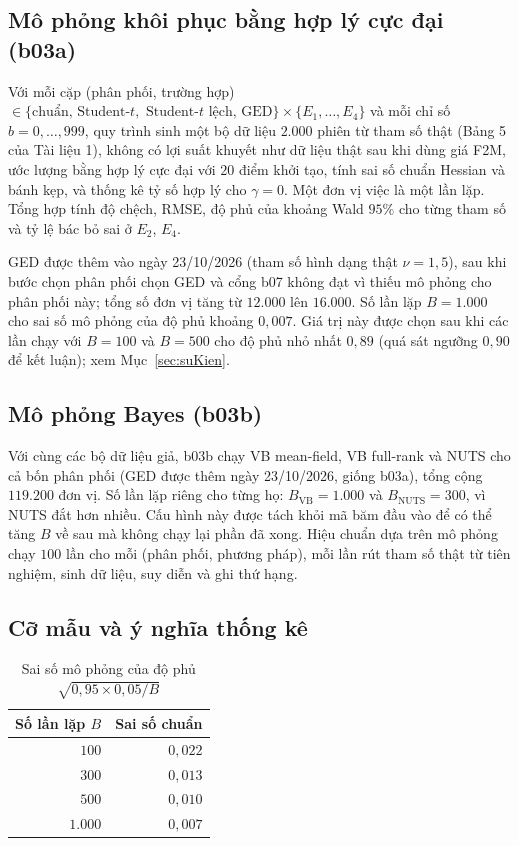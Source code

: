 \documentclass[12pt,a4paper]{article}
\theoremstyle{remark}
\begin{document}
\subsection{Mô phỏng khôi phục bằng hợp lý cực đại (b03a)}

Với mỗi cặp (phân phối, trường hợp) $\in\{\text{chuẩn, Student-}t,\text{ Student-}t\text{ lệch, GED}\}\times\{E_1,\dots,E_4\}$ và mỗi chỉ số $b=0,\dots,999$, quy trình sinh một bộ dữ liệu $2.000$ phiên từ tham số thật (Bảng 5 của Tài liệu 1), không có lợi suất khuyết như dữ liệu thật sau khi dùng giá F2M, ước lượng bằng hợp lý cực đại với $20$ điểm khởi tạo, tính sai số chuẩn Hessian và bánh kẹp, và thống kê tỷ số hợp lý cho $\gamma=0$. Một đơn vị việc là một lần lặp. Tổng hợp tính độ chệch, RMSE, độ phủ của khoảng Wald $95\%$ cho từng tham số và tỷ lệ bác bỏ sai ở $E_2$, $E_4$.

GED được thêm vào ngày 23/10/2026 (tham số hình dạng thật $\nu=1{,}5$), sau khi bước chọn phân phối chọn GED và cổng b07 không đạt vì thiếu mô phỏng cho phân phối này; tổng số đơn vị tăng từ $12.000$ lên $16.000$. Số lần lặp $B=1.000$ cho sai số mô phỏng của độ phủ khoảng $0{,}007$. Giá trị này được chọn sau khi các lần chạy với $B=100$ và $B=500$ cho độ phủ nhỏ nhất $0{,}89$ (quá sát ngưỡng $0{,}90$ để kết luận); xem Mục~\ref{sec:suKien}.

\subsection{Mô phỏng Bayes (b03b)}

Với cùng các bộ dữ liệu giả, b03b chạy VB mean-field, VB full-rank và NUTS cho cả bốn phân phối (GED được thêm ngày 23/10/2026, giống b03a), tổng cộng $119.200$ đơn vị. Số lần lặp riêng cho từng họ: $B_{\mathrm{VB}}=1.000$ và $B_{\mathrm{NUTS}}=300$, vì NUTS đắt hơn nhiều. Cấu hình này được tách khỏi mã băm đầu vào để có thể tăng $B$ về sau mà không chạy lại phần đã xong. Hiệu chuẩn dựa trên mô phỏng chạy $100$ lần cho mỗi (phân phối, phương pháp), mỗi lần rút tham số thật từ tiên nghiệm, sinh dữ liệu, suy diễn và ghi thứ hạng.

\subsection{Cỡ mẫu và ý nghĩa thống kê}

\begin{table}[h]
\centering
\caption{Sai số mô phỏng của độ phủ $\sqrt{0{,}95\times0{,}05/B}$}\label{tab:semc}
\begin{tabular}{@{}rr@{}}
\toprule
\textbf{Số lần lặp $B$} & \textbf{Sai số chuẩn} \\
\midrule
$100$ & $0{,}022$ \\
$300$ & $0{,}013$ \\
$500$ & $0{,}010$ \\
$1.000$ & $0{,}007$ \\
\bottomrule
\end{tabular}
\end{table}
\end{document}
